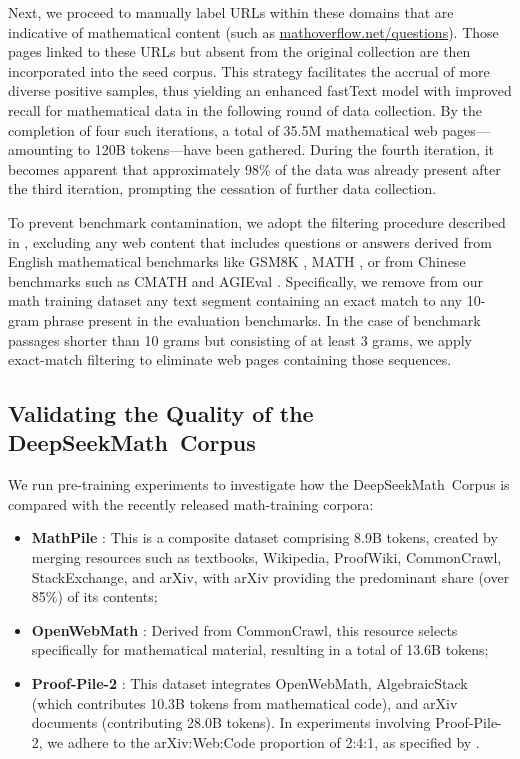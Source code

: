 \begin{itemize}[topsep=0pt]
Next, we proceed to manually label URLs within these domains that are indicative of mathematical content (such as \url{mathoverflow.net/questions}). Those pages linked to these URLs but absent from the original collection are then incorporated into the seed corpus. This strategy facilitates the accrual of more diverse positive samples, thus yielding an enhanced fastText model with improved recall for mathematical data in the following round of data collection. By the completion of four such iterations, a total of 35.5M mathematical web pages—amounting to 120B tokens—have been gathered. During the fourth iteration, it becomes apparent that approximately 98\% of the data was already present after the third iteration, prompting the cessation of further data collection.

To prevent benchmark contamination, we adopt the filtering procedure described in \cite{deepseek-coder}, excluding any web content that includes questions or answers derived from English mathematical benchmarks like GSM8K \citep{gsm8k}, MATH \citep{MATH}, or from Chinese benchmarks such as CMATH \citep{wei2023cmath} and AGIEval \citep{agieval}. Specifically, we remove from our math training dataset any text segment containing an exact match to any 10-gram phrase present in the evaluation benchmarks. In the case of benchmark passages shorter than 10 grams but consisting of at least 3 grams, we apply exact-match filtering to eliminate web pages containing those sequences.

\subsection{Validating the Quality of the DeepSeekMath~Corpus}

We run pre-training experiments to investigate how the DeepSeekMath~Corpus is compared with the recently released math-training corpora:

\begin{itemize}[topsep=0pt]
    \item \textbf{MathPile} \citep{mathpile}: This is a composite dataset comprising 8.9B tokens, created by merging resources such as textbooks, Wikipedia, ProofWiki, CommonCrawl, StackExchange, and arXiv, with arXiv providing the predominant share (over 85\%) of its contents;
    \item \textbf{OpenWebMath} \citep{openwebmath}: Derived from CommonCrawl, this resource selects specifically for mathematical material, resulting in a total of 13.6B tokens;
    \item \textbf{Proof-Pile-2} \citep{llemma}: This dataset integrates OpenWebMath, AlgebraicStack (which contributes 10.3B tokens from mathematical code), and arXiv documents (contributing 28.0B tokens). In experiments involving Proof-Pile-2, we adhere to the arXiv:Web:Code proportion of 2:4:1, as specified by \cite{llemma}.
\end{itemize}


\end{itemize}
